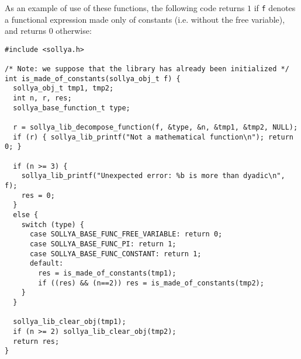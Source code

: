 \documentclass[a4paper]{article}
\begin{document}
As an example of use of these functions, the following code returns $1$ if \texttt{f} denotes a functional expression made only of constants (i.e. without the free variable), and returns $0$ otherwise:

\begin{center}\begin{minipage}{15cm}\begin{Verbatim}[frame=single]
#include <sollya.h>

/* Note: we suppose that the library has already been initialized */
int is_made_of_constants(sollya_obj_t f) {
  sollya_obj_t tmp1, tmp2;
  int n, r, res;
  sollya_base_function_t type;

  r = sollya_lib_decompose_function(f, &type, &n, &tmp1, &tmp2, NULL);
  if (r) { sollya_lib_printf("Not a mathematical function\n"); return 0; }

  if (n >= 3) {
    sollya_lib_printf("Unexpected error: %b is more than dyadic\n", f);
    res = 0;
  }
  else {
    switch (type) {
      case SOLLYA_BASE_FUNC_FREE_VARIABLE: return 0;
      case SOLLYA_BASE_FUNC_PI: return 1;
      case SOLLYA_BASE_FUNC_CONSTANT: return 1;
      default:
        res = is_made_of_constants(tmp1);
        if ((res) && (n==2)) res = is_made_of_constants(tmp2);
    }
  }

  sollya_lib_clear_obj(tmp1);
  if (n >= 2) sollya_lib_clear_obj(tmp2);
  return res;
}
\end{Verbatim}
\end{minipage}\end{center}
\end{document}
